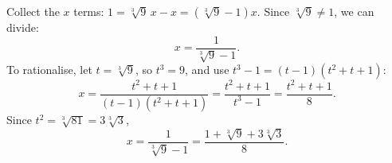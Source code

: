 Collect the $x$ terms: $1=\sqrt[3]9\,x-x=\left(\sqrt[3]9-1\right)x$. Since $\sqrt[3]9\ne1$, we can divide:
\[x=\dfrac{1}{\sqrt[3]9-1}.\]
To rationalise, let $t=\sqrt[3]9$, so $t^3=9$, and use $t^3-1=(t-1)(t^2+t+1)$:
\[x=\dfrac{t^2+t+1}{(t-1)(t^2+t+1)}=\dfrac{t^2+t+1}{t^3-1}=\dfrac{t^2+t+1}{8}.\]
Since $t^2=\sqrt[3]{81}=3\sqrt[3]3$,
\[x=\boxed{\dfrac{1}{\sqrt[3]9-1}=\dfrac{1+\sqrt[3]9+3\sqrt[3]3}{8}}.\]
